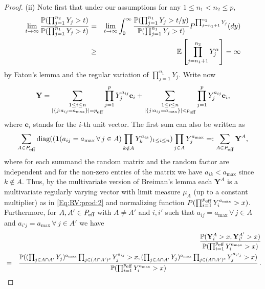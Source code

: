 \begin{proof}
(ii) Note first that under our assumptions for any $1\leq n_1 < n_2 \leq p$,
\begin{eqnarray}\nonumber \lim_{t \to \infty}\frac{{\mathbb P}(\prod_{j=1}^{n_2} Y_j>t)}{{\mathbb P}(\prod_{j=1}^{n_1} Y_j>t)}
\label{Eq:non:conv:equiv} &=& \lim_{t \to \infty} \int_0^\infty \frac{{\mathbb P}(\prod_{j=1}^{n_1} Y_j>t/y)}{{\mathbb P}(\prod_{j=1}^{n_1} Y_j>t)}P^{\prod_{j=n_1+1}^{n_2}Y_j}(dy)\\
&\geq& {\mathbb E}\left[\prod_{j=n_1+1}^{n_2}Y_j^\alpha\right]=\infty
\end{eqnarray}
by Fatou's lemma and the regular variation of $\prod_{j=1}^{n_1}Y_j$. Write now
\begin{equation}\label{Eq:split:sum}\mathbf{Y}=\sum_{\substack{1 \leq i \leq n \\ |\{j:a_{ij}=a_{\max}\}|=p_{\mbox{\scriptsize eff}}}} \prod_{j=1}^p Y_j^{a_{ij}} \mathbf{e}_i + \sum_{\substack{1 \leq i \leq n \\ |\{j:a_{ij}=a_{\max}\}|<p_{\mbox{\scriptsize eff}}}} \prod_{j=1}^p Y_j^{a_{ij}} \mathbf{e}_i,
\end{equation}
where $\mathbf{e}_i$ stands for the $i$-th unit vector. The first sum can also be written as
\begin{equation}\label{Eq:split:YA}\sum_{A \in P_{\mbox{\scriptsize eff}}}\mbox{diag}((\mathbf{1}(a_{ij}=a_{\max} \, \forall\, j \in A)\prod_{k \notin A}Y_k^{a_{ik}})_{1 \leq i \leq n})\prod_{j \in A}Y_j^{a_{\max}}=:\sum_{A \in P_{\mbox{\scriptsize eff}}}\mathbf{Y}^A, 
\end{equation}
where for each summand the random matrix and the random factor are independent and for the non-zero entries of the matrix we have $a_{ik}<a_{\max}$ since $k \notin A$. Thus, by the multivariate version of Breiman's lemma each $\mathbf{Y}^A$ is a multivariate regularly varying vector with limit measure $\mu_A$ (up to a constant multiplier) as in \eqref{Eq:RV:prod:2} and normalizing function $P(\prod_{i=1}^{p_{\mbox{\scriptsize eff}}}Y_i^{a_{\max}}>x)$. Furthermore, for $A, A' \in P_{\mbox{\scriptsize eff}}$ with $A \neq A'$ and $i,i'$ such that $a_{ij}=a_{\max} \, \forall\, j \in A$ and $a_{i'j}=a_{\max} \, \forall\, j \in A'$ we have
\begin{eqnarray}\label{Eq:asymp:ind:YA} && \frac{\P(\mathbf{Y}^A_i>x,\mathbf{Y}^{A'}_{i'}>x)}{\P(\prod_{i=1}^{p_{\mbox{\scriptsize eff}}}Y_i^{a_{\max}}>x)}\\
\nonumber &=& \frac{\P((\prod_{j \in A \cap A'}Y_j)^{a_{\max}}\prod_{j \in (A \cap A')^c}Y_j^{a_{ij}}>x,(\prod_{j \in A \cap A'}Y_j)^{a_{\max}}\prod_{j \in (A \cap A')^c}Y_j^{a_{i'j}}>x)}{\P(\prod_{i=1}^{p_{\mbox{\scriptsize eff}}}Y_i^{a_{\max}}>x)}\,. 

\end{eqnarray}
\end{proof}

